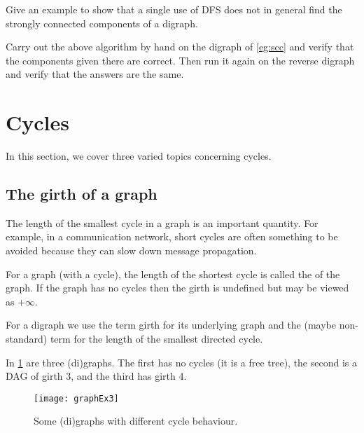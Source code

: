 \begin{Exercise}
\label{ex:DFSfails}
Give an example to show that a single use of DFS does not in general
find the strongly connected components of a digraph.
\end{Exercise}

\begin{Exercise}
\label{ex:dolinscc}
Carry out the above  algorithm by hand on the digraph of
\cref{eg:scc} and verify that the components given there are
correct. Then run it again on the reverse digraph and verify that the
answers are the same.
\end{Exercise}


\section{Cycles}
\label{sec:cycles}

In this section, we cover three varied topics concerning cycles.

\subsection{The girth of a graph}
\label{subssec:girth}

The length of the smallest cycle in a graph is an important quantity. 
For example, in a communication network, short cycles are often something to be
avoided because they can slow down message propagation.

\begin{Definition}
For a graph (with a cycle), the length of the shortest cycle is called
the  of the graph. If the graph has no cycles then the
girth is undefined but may be viewed as $+\infty$.
\end{Definition}

\begin{note} 
For a digraph we use the term girth for its underlying
graph and the (maybe non-standard) term  for
the length of the smallest directed cycle.
\end{note}

\begin{Example}
\label{eg:cycles}
In \cref{fig:cycle} are three (di)graphs.  The first has no cycles 
(it is a free tree), the second is a DAG of girth 3, and the third has girth 4.
\end{Example}

\begin{figure}
\centering
\texttt{[image: graphEx3]}
\caption{Some (di)graphs with different cycle behaviour.}
\label{fig:cycle}
\end{figure}

